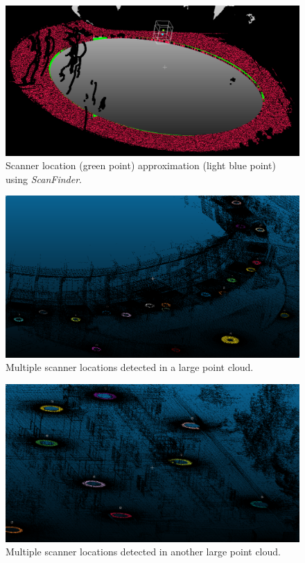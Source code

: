 \begin{figure}
  \centering
  \includegraphics[scale=0.4]{img/ellipse-result.png}
  \caption{Scanner location (green point) approximation (light blue point) using \emph{ScanFinder}. }
  \label{fig:ellipse-result}
\end{figure}
\begin{figure}
  \centering
  \includegraphics[scale=0.3]{img/ellipse-multi1.png}
  \caption{Multiple scanner locations detected in a large point cloud.}
  \label{fig:ellipse-multi1}
\end{figure}
\begin{figure}
  \centering
  \includegraphics[scale=0.3]{img/ellipse-multi2.png}
  \caption{Multiple scanner locations detected in another large point cloud.}
  \label{fig:ellipse-multi2}
\end{figure}

